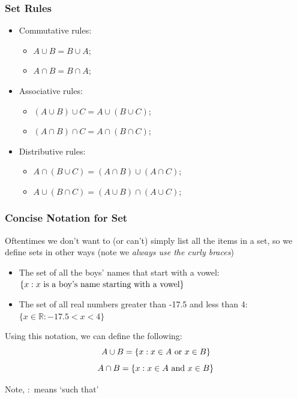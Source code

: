 \documentclass[aspectratio=169, handout]{beamer}
\numberwithin{equation}{section}
\begin{document}
\begin{frame}
\frametitle{Set Rules}


\begin{itemize}
\item Commutative rules:
\begin{itemize}
\item $A \cup B = B\cup A$;
\item $A \cap B = B\cap A$;
\end{itemize}
\item Associative rules:
\begin{itemize}
\item $(A \cup B) \cup C = A \cup (B \cup C)$;
\item $(A \cap B) \cap C = A \cap (B \cap C)$;
\end{itemize}
\item Distributive rules:
\begin{itemize}
\item $A \cap (B \cup C) = (A \cap B) \cup (A \cap C)$;
\item $A \cup (B \cap C) = (A \cup B) \cap (A \cup C)$;
\end{itemize}
\end{itemize}
\end{frame}



\begin{frame}
\frametitle{Concise Notation for Set}

Oftentimes we don't want to (or can't) simply list all the items in a set, so we define sets in other ways (note  we \textit{always use the curly braces}) \pause

\begin{itemize}
\item The set of all the boys' names that start with a vowel: $\{x: x\hbox{ is a boy's name starting with a vowel}\}$
\item The set of all real numbers greater than -17.5 and less than 4: $\{x\in \mathbb{R}:-17.5<x<4\}$ \pause
\end{itemize}
 
Using this notation, we can define the following:
$$A\cup B=\{x: x\in A \hbox{ or } x\in B\}$$
$$A\cap B=\{x: x\in A \hbox{ and } x\in B\}$$

Note, $:$ means `such that'
\end{frame}



\end{document}

